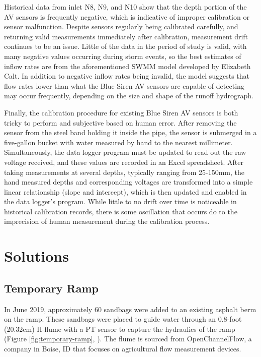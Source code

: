 Historical data from inlet N8, N9, and N10 show that the depth portion of the AV sensors is frequently negative, which is indicative of improper calibration or sensor malfunction.
Despite sensors regularly being calibrated carefully, and returning valid measurements immediately after calibration, measurement drift continues to be an issue.
Little of the data in the period of study is valid, with many negative values occurring during storm events, so the best estimates of inflow rates are from the aforementioned SWMM model developed by Elizabeth Calt.
In addition to negative inflow rates being invalid, the model suggests that flow rates lower than what the Blue Siren AV sensors are capable of detecting may occur frequently, depending on the size and shape of the runoff hydrograph.

Finally, the calibration procedure for existing Blue Siren AV sensors is both tricky to perform and subjective based on human error.
After removing the sensor from the steel band holding it inside the pipe, the sensor is submerged in a five-gallon bucket with water measured by hand to the nearest millimeter.
Simultaneously, the data logger program must be updated to read out the raw voltage received, and these values are recorded in an Excel spreadsheet.
After taking measurements at several depths, typically ranging from 25-150mm, the hand measured depths and corresponding voltages are transformed into a simple linear relationship (slope and intercept), which is then updated and enabled in the data logger's program.
While little to no drift over time is noticeable in historical calibration records, there is some oscillation that occurs do to the imprecision of human measurement during the calibration process.


\section{Solutions}

\subsection{Temporary Ramp}

In June 2019, approximately 60 sandbags were added to an existing asphalt berm on the ramp.
These sandbags were placed to guide water through an 0.8-foot (20.32cm) H-flume with a PT sensor to capture the hydraulics of the ramp (Figure \ref{fig:temporary-ramp}, \cite{OpenChannelFlow2021}).
The flume is sourced from OpenChannelFlow, a company in Boise, ID that focuses on agricultural flow measurement devices.

